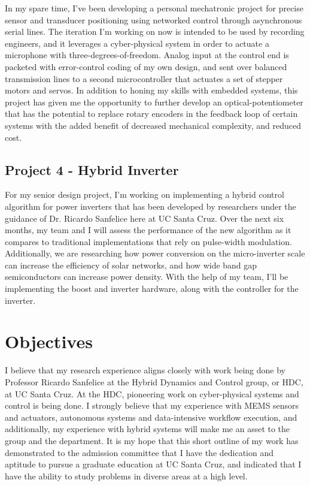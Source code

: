 \documentclass[journal]{IEEEtran}
\begin{document}
In my spare time, I've been developing a personal mechatronic project for precise sensor and transducer positioning using networked control through asynchronous serial lines. The iteration I'm working on now is intended to be used by recording engineers, and it leverages a cyber-physical system in order to actuate a microphone with three-degrees-of-freedom. Analog input at the control end is packeted with error-control coding of my own design, and sent over balanced transmission lines to a second microcontroller that actuates a set of stepper motors and servos. In addition to honing my skills with embedded systems, this project has given me the opportunity to further develop an optical-potentiometer that has the potential to replace rotary encoders in the feedback loop of certain systems with the added benefit of decreased mechanical complexity, and reduced cost. 

\subsection{Project 4 - Hybrid Inverter}

For my senior design project, I'm working on implementing a hybrid control algorithm for power inverters that has been developed by researchers under the guidance of Dr. Ricardo Sanfelice here at UC Santa Cruz. Over the next six months, my team and I will assess the performance of the new algorithm as it compares to traditional implementations that rely on pulse-width modulation. Additionally, we are researching how power conversion on the micro-inverter scale can increase the efficiency of solar networks, and how wide band gap semiconductors can increase power density. With the help of my team, I'll be implementing the boost and inverter hardware, along with the controller for the inverter. 
 
\section{Objectives}

I believe that my research experience aligns closely with work being done by Professor Ricardo Sanfelice at the Hybrid Dynamics and Control group, or HDC, at UC Santa Cruz. At the HDC, pioneering work on cyber-physical systems and control is being done. I strongly believe that my experience with MEMS sensors and actuators, autonomous systems and data-intensive workflow execution, and additionally, my experience with hybrid systems will make me an asset to the group and the department.
It is my hope that this short outline of my work has demonstrated to the admission committee that I have the dedication and aptitude to pursue a graduate education at UC Santa Cruz, and indicated that I have the ability to study problems in diverse areas at a high level.
\end{document}
